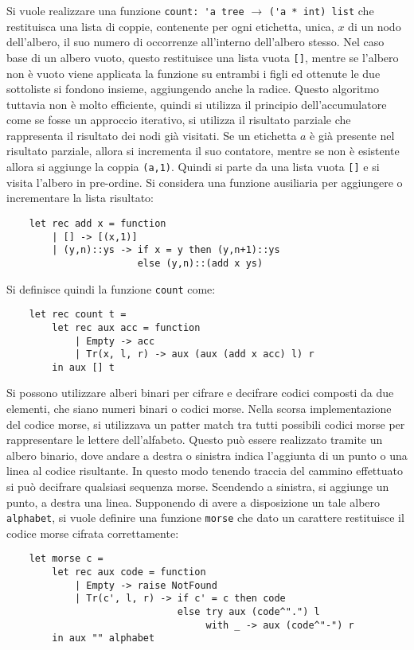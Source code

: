 \documentclass{article}
\numberwithin{equation}{subsection}
\begin{document}
Si vuole realizzare una funzione \verb|count: 'a tree| $\rightarrow$ \verb|('a * int) list| che restituisca una lista di coppie, contenente per ogni etichetta, unica, $x$ di un nodo dell'albero, il suo numero di occorrenze all'interno dell'albero stesso. 
Nel caso base di un albero vuoto, questo restituisce una lista vuota \verb|[]|, mentre se l'albero non è vuoto viene applicata la funzione su entrambi i figli ed ottenute le due sottoliste si fondono insieme, aggiungendo anche la radice. 
Questo algoritmo tuttavia non è molto efficiente, quindi si utilizza il principio dell'accumulatore come se fosse un approccio iterativo, si utilizza il risultato parziale che rappresenta il risultato dei nodi già visitati. Se un etichetta $a$ è già presente nel risultato parziale, allora si incrementa il suo contatore, mentre se non è esistente allora si aggiunge la coppia \verb|(a,1)|. Quindi si parte da una lista vuota \verb|[]| e si visita l'albero in pre-ordine. 
Si considera una funzione ausiliaria per aggiungere o incrementare la lista risultato:
\begin{verbatim}
    let rec add x = function
        | [] -> [(x,1)]
        | (y,n)::ys -> if x = y then (y,n+1)::ys
                       else (y,n)::(add x ys)    
\end{verbatim}
Si definisce quindi la funzione \verb|count| come:
\begin{verbatim}
    let rec count t =
        let rec aux acc = function
            | Empty -> acc
            | Tr(x, l, r) -> aux (aux (add x acc) l) r
        in aux [] t
\end{verbatim}

Si possono utilizzare alberi binari per cifrare e decifrare codici composti da due elementi, che siano numeri binari o codici morse. Nella scorsa implementazione del codice morse, si utilizzava un patter match tra tutti possibili codici morse per rappresentare le lettere dell'alfabeto. Questo può essere realizzato tramite un albero binario, dove andare a destra o sinistra indica l'aggiunta di un punto o una linea al codice risultante. In questo modo tenendo traccia del cammino effettuato si può decifrare qualsiasi sequenza morse. Scendendo a sinistra, si aggiunge un punto, a destra una linea. Supponendo di avere a disposizione un tale albero \verb|alphabet|, si vuole definire una funzione \verb|morse| che dato un carattere restituisce il codice morse cifrata correttamente:
\begin{verbatim}
    let morse c =  
        let rec aux code = function
            | Empty -> raise NotFound
            | Tr(c', l, r) -> if c' = c then code
                              else try aux (code^".") l
                                   with _ -> aux (code^"-") r
        in aux "" alphabet
\end{verbatim}
\end{document}
